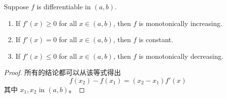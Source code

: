 \documentclass[../poma-notes.tex]{subfiles}
\begin{document}
\begin{theorem}
  Suppose $f$ is differentiable in $(a, b)$.
  \begin{enumerate}[label=(\alph*)]
    \item If $f'(x) \ge 0$ for all $x \in (a,b)$, then $f$ is monotonically increasing.
    \item If $f'(x) = 0$ for all $x \in (a,b)$, then $f$ is constant.
    \item If $f'(x) \le 0$ for all $x \in (a, b)$, then $f$ is monotonically decreasing.
  \end{enumerate}
\end{theorem}

\begin{proof}
  所有的结论都可以从该等式得出
  \[
    f(x_2) - f(x_1) = (x_2 - x_1) f'(x)
  \]
  其中 $x_1, x_2 \text{ in } (a, b)$。
\end{proof}
\end{document}
